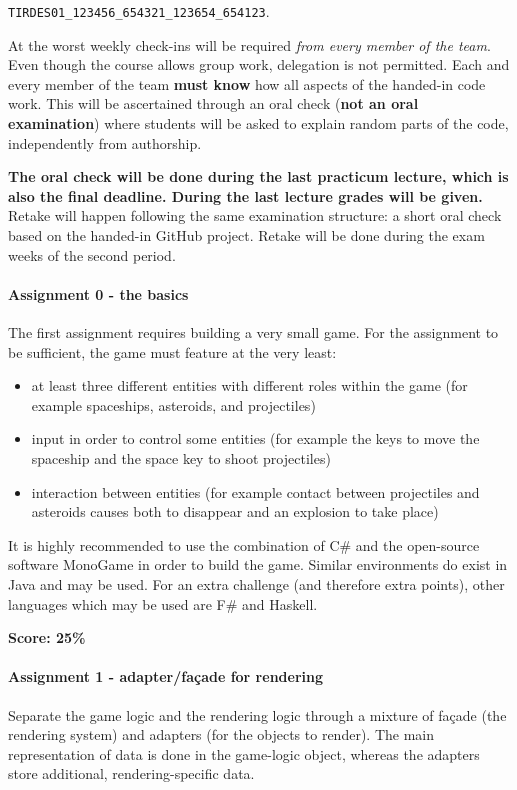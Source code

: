 \documentclass[titlepage,a4paper, 11pt]{article}
\begin{document}
\texttt{TIRDES01\_123456\_654321\_123654\_654123}.

At the worst weekly check-ins will be required \textit{from every member of the team}. Even though the course allows group work, delegation is not permitted. Each and every member of the team \textbf{must know} how all aspects of the handed-in code work. This will be ascertained through an oral check (\textbf{not an oral examination}) where students will be asked to explain random parts of the code, independently from authorship.

\textbf{The oral check will be done during the last practicum lecture, which is also the final deadline. During the last lecture grades will be given.} Retake will happen following the same examination structure: a short oral check based on the handed-in GitHub project. Retake will be done during the exam weeks of the second period.

\paragraph*{Assignment 0 - the basics}
The first assignment requires building a very small game. For the assignment to be sufficient, the game must feature at the very least:
\begin{itemize}
\item at least three different entities with different roles within the game (for example spaceships, asteroids, and projectiles)
\item input in order to control some entities (for example the keys to move the spaceship and the space key to shoot projectiles)
\item interaction between entities (for example contact between projectiles and asteroids causes both to disappear and an explosion to take place)
\end{itemize}

It is highly recommended to use the combination of C\# and the open-source software MonoGame in order to build the game. Similar environments do exist in Java and may be used. For an extra challenge (and therefore extra points), other languages which may be used are F\# and Haskell.

\textbf{Score: 25\%}


\paragraph*{Assignment 1 - adapter/façade for rendering}
Separate the game logic and the rendering logic through a mixture of façade (the rendering system) and adapters (for the objects to render). The main representation of data is done in the game-logic object, whereas the adapters store additional, rendering-specific data.
\end{document}
